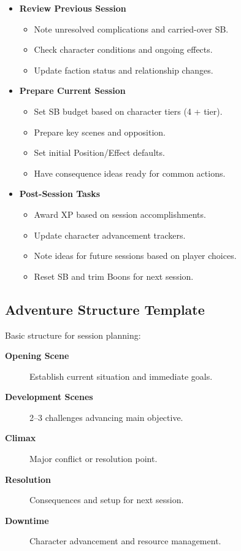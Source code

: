 \begin{itemize}
\item \textbf{Review Previous Session}
  \begin{itemize}
  \item Note unresolved complications and carried-over SB.
  \item Check character conditions and ongoing effects.
  \item Update faction status and relationship changes.
  \end{itemize}

\item \textbf{Prepare Current Session}
  \begin{itemize}
  \item Set SB budget based on character tiers (4 + tier).
  \item Prepare key scenes and opposition.
  \item Set initial Position/Effect defaults.
  \item Have consequence ideas ready for common actions.
  \end{itemize}

\item \textbf{Post-Session Tasks}
  \begin{itemize}
  \item Award XP based on session accomplishments.
  \item Update character advancement trackers.
  \item Note ideas for future sessions based on player choices.
  \item Reset SB and trim Boons for next session.
  \end{itemize}
\end{itemize}

\subsection{Adventure Structure Template}
\label{subsec:adventure-template}

Basic structure for session planning:

\begin{description}
\item[\textbf{Opening Scene}] Establish current situation and immediate goals.
\item[\textbf{Development Scenes}] 2--3 challenges advancing main objective.
\item[\textbf{Climax}] Major conflict or resolution point.
\item[\textbf{Resolution}] Consequences and setup for next session.
\item[\textbf{Downtime}] Character advancement and resource management.
\end{description}

